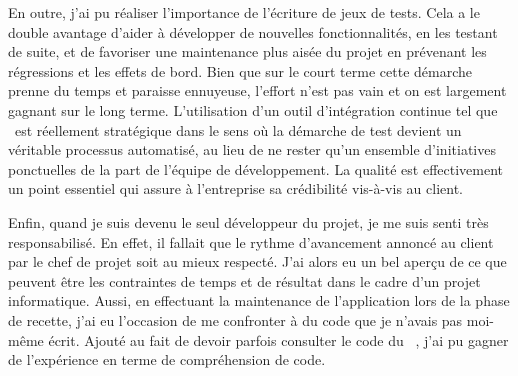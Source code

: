 En outre, j'ai pu réaliser l'importance de l'écriture de jeux de tests. Cela a le double avantage d'aider à développer de nouvelles fonctionnalités, en les testant de suite, et de favoriser une maintenance plus aisée du projet en prévenant les régressions et les effets de bord. Bien que sur le court terme cette démarche prenne du temps et paraisse ennuyeuse, l'effort n'est pas vain et on est largement gagnant sur le long terme. L'utilisation d'un outil d'intégration continue tel que \asismo\ est réellement stratégique dans le sens où la démarche de test devient un véritable processus automatisé, au lieu de ne rester qu'un ensemble d'initiatives ponctuelles de la part de l'équipe de développement. La qualité est effectivement un point essentiel qui assure à l'entreprise sa crédibilité vis-à-vis au client.

Enfin, quand je suis devenu le seul développeur du projet, je me suis senti très responsabilisé. En effet, il fallait que le rythme d'avancement annoncé au client par le chef de projet soit au mieux respecté. J'ai alors eu un bel aperçu de ce que peuvent être les contraintes de temps et de résultat dans le cadre d'un projet informatique. Aussi, en effectuant la maintenance de l'application lors de la phase de recette, j'ai eu l'occasion de me confronter à du code que je n'avais pas moi-même écrit. Ajouté au fait de devoir parfois consulter le code du \afm\ \asf, j'ai pu gagner de l'expérience en terme de compréhension de code.
